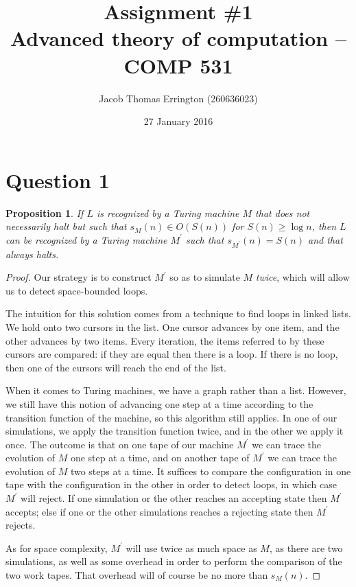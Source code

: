 \documentclass[11pt,letterpaper]{article}
\author{Jacob Thomas Errington (260636023)}
\title{Assignment \#1\\Advanced theory of computation -- COMP 531}
\date{27 January 2016}
\newtheorem{proposition}{Proposition}
\begin{document}
\maketitle

\section*{Question 1}

\begin{proposition}
    If $L$ is recognized by a Turing machine $M$ that does not necessarily halt
    but such that $s_M(n) \in O(S(n))$ for $S(n) \geq \log n$, then $L$ can be
    recognized by a Turing machine $M^\prime$ such that
    $s_{M^\prime}(n) = S(n)$ and that always halts.
\end{proposition}

\begin{proof}
    Our strategy is to construct $M^\prime$ so as to simulate $M$ \emph{twice},
    which will allow us to detect space-bounded loops.

    The intuition for this solution comes from a technique to find loops in
    linked lists. We hold onto two cursors in the list. One cursor advances by
    one item, and the other advances by two items. Every iteration, the items
    referred to by these cursors are compared: if they are equal then there is
    a loop. If there is no loop, then one of the cursors will reach the end of
    the list.

    When it comes to Turing machines, we have a graph rather than a list.
    However, we still have this notion of advancing one step at a time
    according to the transition function of the machine, so this algorithm
    still applies. In one of our simulations, we apply the transition function
    twice, and in the other we apply it once. The outcome is that on one tape
    of our machine $M^\prime$ we can trace the evolution of $M$ one step at a
    time, and on another tape of $M^\prime$ we can trace the evolution of $M$
    two steps at a time. It suffices to compare the configuration in one tape
    with the configuration in the other in order to detect loops, in which case
    $M^\prime$ will reject. If one simulation or the other reaches an accepting
    state then $M^\prime$ accepts; else if one or the other simulations reaches
    a rejecting state then $M^\prime$ rejects.

    As for space complexity, $M^\prime$ will use twice as much space as $M$, as
    there are two simulations, as well as some overhead in order to perform the
    comparison of the two work tapes. That overhead will of course be no more
    than $s_M(n)$.
\end{proof}
\end{document}
